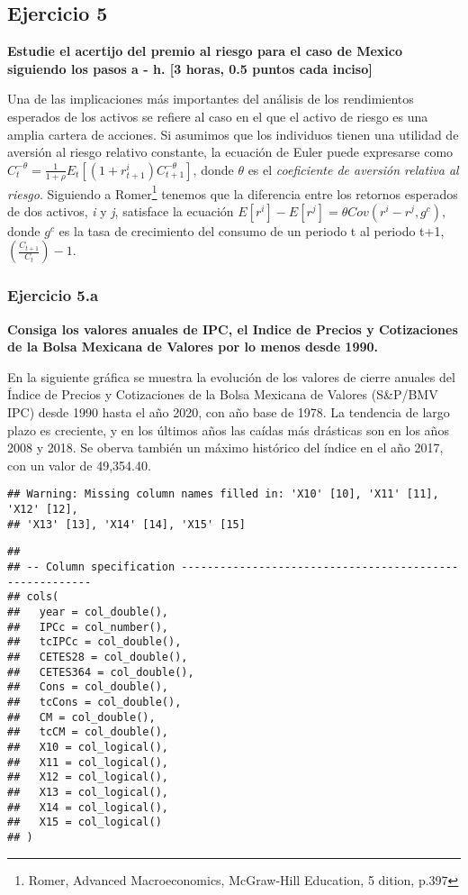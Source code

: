 \documentclass[
]{article}
\begin{document}
\newpage

\hypertarget{ejercicio-5}{%
\subsection{Ejercicio 5}\label{ejercicio-5}}

\textbf{Estudie el acertijo del premio al riesgo para el caso de Mexico
siguiendo los pasos a - h. {[}3 horas, 0.5 puntos cada inciso{]}}

Una de las implicaciones más importantes del análisis de los
rendimientos esperados de los activos se refiere al caso en el que el
activo de riesgo es una amplia cartera de acciones. Si asumimos que los
individuos tienen una utilidad de aversión al riesgo relativo constante,
la ecuación de Euler puede expresarse como
\(C_t^{-\theta}=\frac{1}{1+\rho}E_t[(1+r^i_{t+1})C^{-\theta}_{t+1}]\),
donde \(\theta\) es el \emph{coeficiente de aversión relativa al
riesgo}. Siguiendo a Romer\footnote{Romer, Advanced Macroeconomics,
  McGraw-Hill Education, 5 dition, p.397} tenemos que la diferencia
entre los retornos esperados de dos activos, \emph{i} y \emph{j},
satisface la ecuación \(E[r^i]-E[r^j]=\theta Cov(r^i-r^j, g^c)\), donde
\(g^c\) es la tasa de crecimiento del consumo de un periodo t al periodo
t+1, \((\frac{C_{t+1}}{C_t})-1\).

\hypertarget{ejercicio-5.a}{%
\subsubsection{Ejercicio 5.a}\label{ejercicio-5.a}}

\textbf{Consiga los valores anuales de IPC, el Indice de Precios y
Cotizaciones de la Bolsa Mexicana de Valores por lo menos desde 1990.}

En la siguiente gráfica se muestra la evolución de los valores de cierre
anuales del Índice de Precios y Cotizaciones de la Bolsa Mexicana de
Valores (S\&P/BMV IPC) desde 1990 hasta el año 2020, con año base de
1978. La tendencia de largo plazo es creciente, y en los últimos años
las caídas más drásticas son en los años 2008 y 2018. Se oberva también
un máximo histórico del índice en el año 2017, con un valor de
49,354.40.

\begin{verbatim}
## Warning: Missing column names filled in: 'X10' [10], 'X11' [11], 'X12' [12],
## 'X13' [13], 'X14' [14], 'X15' [15]
\end{verbatim}

\begin{verbatim}
## 
## -- Column specification --------------------------------------------------------
## cols(
##   year = col_double(),
##   IPCc = col_number(),
##   tcIPCc = col_double(),
##   CETES28 = col_double(),
##   CETES364 = col_double(),
##   Cons = col_double(),
##   tcCons = col_double(),
##   CM = col_double(),
##   tcCM = col_double(),
##   X10 = col_logical(),
##   X11 = col_logical(),
##   X12 = col_logical(),
##   X13 = col_logical(),
##   X14 = col_logical(),
##   X15 = col_logical()
## )
\end{verbatim}
\end{document}
